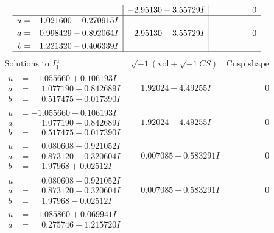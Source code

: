 \documentclass[1p]{elsarticle_modified}
\theoremstyle{definition}
\newcommand{\I}{\sqrt{-1}}
\begin{document}
$$\begin{array}{c|c|c}
 & -2.95130 - 3.55729 I & \phantom{-0.000000 } 0 \\ \hline\begin{aligned}
u &= -1.021600 - 0.270915 I \\
a &= \phantom{-}0.998429 + 0.892064 I \\
b &= \phantom{-}1.221320 - 0.406339 I\end{aligned}
 & -2.95130 + 3.55729 I & \phantom{-0.000000 } 0\\
 \hline 
 \end{array}$$\newpage$$\begin{array}{c|c|c}  
\text{Solutions to }I^u_{1}& \I (\text{vol} + \sqrt{-1}CS) & \text{Cusp shape}\\
 \hline 
\begin{aligned}
u &= -1.055660 + 0.106193 I \\
a &= \phantom{-}1.077190 + 0.842689 I \\
b &= \phantom{-}0.517475 + 0.017390 I\end{aligned}
 & \phantom{-}1.92024 - 4.49255 I & \phantom{-0.000000 } 0 \\ \hline\begin{aligned}
u &= -1.055660 - 0.106193 I \\
a &= \phantom{-}1.077190 - 0.842689 I \\
b &= \phantom{-}0.517475 - 0.017390 I\end{aligned}
 & \phantom{-}1.92024 + 4.49255 I & \phantom{-0.000000 } 0 \\ \hline\begin{aligned}
u &= \phantom{-}0.080608 + 0.921052 I \\
a &= \phantom{-}0.873120 - 0.320604 I \\
b &= \phantom{-}1.97968 + 0.02512 I\end{aligned}
 & \phantom{-}0.007085 + 0.583291 I & \phantom{-0.000000 } 0 \\ \hline\begin{aligned}
u &= \phantom{-}0.080608 - 0.921052 I \\
a &= \phantom{-}0.873120 + 0.320604 I \\
b &= \phantom{-}1.97968 - 0.02512 I\end{aligned}
 & \phantom{-}0.007085 - 0.583291 I & \phantom{-0.000000 } 0 \\ \hline\begin{aligned}
u &= -1.085860 + 0.069941 I \\
a &= \phantom{-}0.275746 + 1.215720 I \\

\end{aligned}
\end{array}$$
\end{document}
